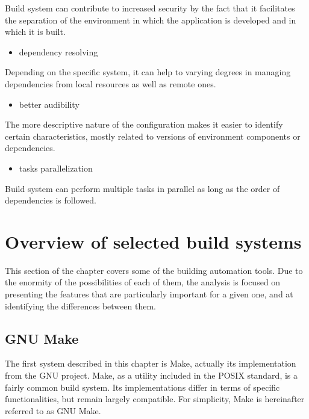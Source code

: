 Build system can contribute to increased security by the fact that it
facilitates the separation of the environment in which the application
is developed and in which it is built.

\begin{itemize}
\tightlist
\item
  dependency resolving
\end{itemize}

Depending on the specific system, it can help to varying degrees in
managing dependencies from local resources as well as remote ones.

\begin{itemize}
\tightlist
\item
  better audibility
\end{itemize}

The more descriptive nature of the configuration makes it easier to
identify certain characteristics, mostly related to versions of
environment components or dependencies.

\begin{itemize}
\tightlist
\item
  tasks parallelization
\end{itemize}

Build system can perform multiple tasks in parallel as long as the order
of dependencies is followed.

\hypertarget{overview-of-selected-build-systems}{%
\section{Overview of selected build
systems}\label{overview-of-selected-build-systems}}

This section of the chapter covers some of the building automation
tools. Due to the enormity of the possibilities of each of them, the
analysis is focused on presenting the features that are particularly
important for a given one, and at identifying the differences between
them.

\hypertarget{gnu-make}{%
\subsection{GNU Make}\label{gnu-make}}

The first system described in this chapter is Make, actually its
implementation from the GNU project. Make, as a utility included in the
POSIX standard, is a fairly common build system. Its implementations
differ in terms of specific functionalities, but remain largely
compatible. For simplicity, Make is hereinafter referred to as GNU Make.

